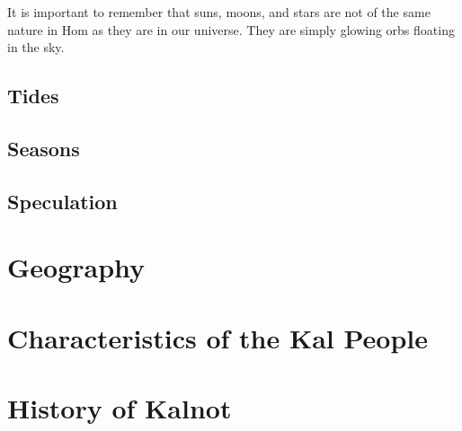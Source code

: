 \documentclass{article}
\begin{document}
It is important to remember that suns, moons, and stars are not of the same nature in Hom as they are in our universe. They are simply glowing orbs floating in the sky.

\subsection{Tides}

\subsection{Seasons}

\subsection{Speculation}

\section{Geography}

\section{Characteristics of the Kal People}

\section{History of Kalnot}
\end{document}

